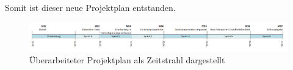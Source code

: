 Somit ist dieser neue Projektplan entstanden.

\begin{figure}[H]
	\centering
	\includegraphics[width=\textwidth]{images/projektmanagement/zeitstrahl_v2.png}
	\caption{Überarbeiteter Projektplan als Zeitstrahl dargestellt}
	\label{image-project-plan-timeline2}
\end{figure}




